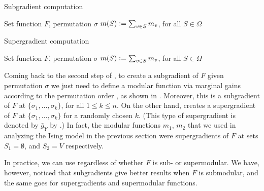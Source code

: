 \begin{algorithm}[tb]
	\caption{Subgradient computation}
	\label{alg:sub}
	\small{
		\begin{algorithmic}[1]
			\REQUIRE Set function $F$, permutation $\sigma$
			\ENDFOR
            \RETURN $m(S) \vcentcolon= \sum_{v \in S} m_v$, for all $S \in \Omega$
		\end{algorithmic}
	}
\end{algorithm}

\begin{algorithm}[tb]
	\caption{Supergradient computation}
	\label{alg:super}
	\small{
		\begin{algorithmic}[1]
			\REQUIRE Set function $F$, permutation $\sigma$
            \ENDFOR
			\ENDFOR
            \RETURN $m(S) \vcentcolon= \sum_{v \in S} m_v$, for all $S \in \Omega$
		\end{algorithmic}
	}
\end{algorithm}

Coming back to the second step of , to create a subgradient of $F$ given permutation $\sigma$ we just need to define a modular function via marginal gains according to the permutation order \citep{iyer13}, as shown in .
Moreover, this is a subgradient of $F$ at $\{\sigma_1, \ldots, \sigma_k\}$, for all $1 \leq k \leq n$.
On the other hand,  creates a supergradient of $F$ at $\{\sigma_1, \ldots, \sigma_k\}$ for a randomly chosen $k$. (This type of supergradient is denoted by $\bar{g}_Y$ by \cite{iyer13}.)
In fact, the modular functions $m_1$, $m_2$ that we used in analyzing the Ising model in the previous section were supergradients of $F$ at sets $S_1 = \emptyset$, and $S_2 = V$ respectively.

In practice, we can use  regardless of whether $F$ is sub- or supermodular.
We have, however, noticed that subgradients give better results when $F$ is submodular, and the same goes for supergradients and supermodular functions.

